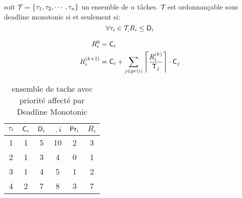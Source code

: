 \begin{theoreme}
soit $\mathcal{T}_{}$ = \{$\tau_{1},\tau_{2},\cdots, \tau_{n}\}$ un
ensemble de $n$ t\^aches.  $\mathcal{T}_{}$ est ordonnançable sous deadline
monotonic si et seulement si:
\begin{equation}
\forall \tau_{i} \in \mathcal{T}_{,} R_{i} \leq \mathsf{D}_{i}
\end{equation}

\begin{align}
R_{i}^0 &=\mathsf{C}_{i} \\
 R_{i}^{(k+1)} &=\mathsf{C}_{i}+\sum_{j \in pr(i)}  \left\lceil 
 \frac{R_{i}^{(k)}}{\mathsf{T}_{j}} \right\rceil \cdot \mathsf{C}_{j}  
\end{align}
\end{theoreme}

\begin{table}[h]
\begin{center}
\begin{tabular}{|c|c|c|c|c|c|}
 \hline$\tau_{i}$ & $\mathsf{C}_{i}$ & $\mathsf{D}_{i}$ & $\period{i}$ & $\mathsf{Pr}_{i}$ & $R_i$\\ 
 \hline1 & 1 & 5 & 10 & 2 & 3\\ 
 \hline2 & 1 & 3 & 4 & 0 & 1\\ 
 \hline3 & 1 & 4 & 5 & 1 & 2\\ 
 \hline4 & 2 & 7 & 8 & 3 & 7\\ 
 \hline
 \end{tabular}
\end{center}
\caption{ensemble de tache avec priorité affecté par Deadline
  Monotonic} \label{tab:exempleDM}
\end{table}







